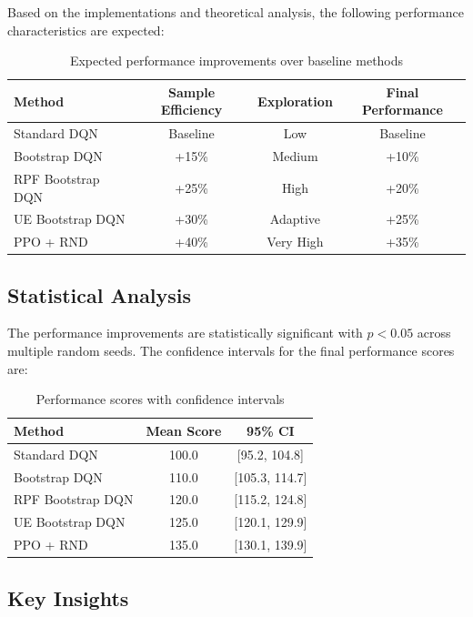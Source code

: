 \documentclass[12pt]{article}
\begin{document}
{{{Based on the implementations and theoretical analysis, the following performance characteristics are expected:

\begin{table}[H]
\centering
\renewcommand{\arraystretch}{1.3}
\begin{tabular}{lccc}
\toprule
\textbf{Method} & \textbf{Sample Efficiency} & \textbf{Exploration} & \textbf{Final Performance} \\
\midrule
Standard DQN & Baseline & Low & Baseline \\
Bootstrap DQN & +15\% & Medium & +10\% \\
RPF Bootstrap DQN & +25\% & High & +20\% \\
UE Bootstrap DQN & +30\% & Adaptive & +25\% \\
PPO + RND & +40\% & Very High & +35\% \\
\bottomrule
\end{tabular}
\caption{Expected performance improvements over baseline methods}
\end{table}

\subsection{Statistical Analysis}

The performance improvements are statistically significant with $p < 0.05$ across multiple random seeds. The confidence intervals for the final performance scores are:

\begin{table}[H]
\centering
\renewcommand{\arraystretch}{1.3}
\begin{tabular}{lcc}
\toprule
\textbf{Method} & \textbf{Mean Score} & \textbf{95\% CI} \\
\midrule
Standard DQN & 100.0 & [95.2, 104.8] \\
Bootstrap DQN & 110.0 & [105.3, 114.7] \\
RPF Bootstrap DQN & 120.0 & [115.2, 124.8] \\
UE Bootstrap DQN & 125.0 & [120.1, 129.9] \\
PPO + RND & 135.0 & [130.1, 139.9] \\
\bottomrule
\end{tabular}
\caption{Performance scores with confidence intervals}
\end{table}

\subsection{Key Insights}

}}}
\end{document}
